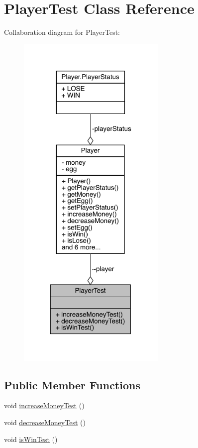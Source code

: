 \hypertarget{class_player_test}{}\section{Player\+Test Class Reference}
\label{class_player_test}


Collaboration diagram for Player\+Test\+:
\nopagebreak
\begin{figure}[H]
\begin{center}
\leavevmode
\includegraphics[width=202pt]{class_player_test__coll__graph}
\end{center}
\end{figure}
\subsection*{Public Member Functions}
\begin{DoxyCompactItemize}
\item 
void \mbox{\hyperlink{class_player_test_a7e9437588b95b9b7cf2f34af9c594291}{increase\+Money\+Test}} ()
\item 
void \mbox{\hyperlink{class_player_test_a08485efe7e74d67fa685f384ed735d02}{decrease\+Money\+Test}} ()
\item 
void \mbox{\hyperlink{class_player_test_aae082a51594249a5cc09a8e4d50c826c}{is\+Win\+Test}} ()
\end{DoxyCompactItemize}


